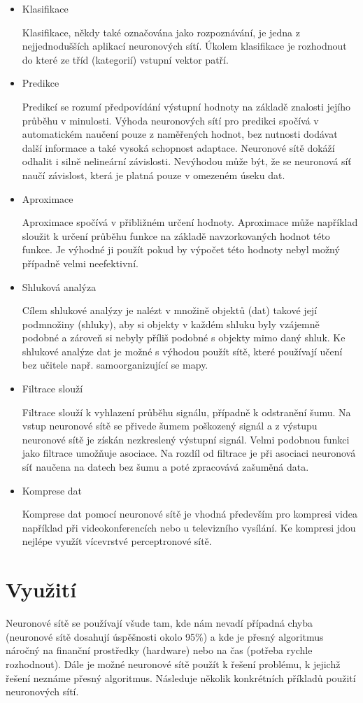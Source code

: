 \documentclass[11pt,twoside,a4paper]{book}
\begin{document}
\begin{itemize}
\item Klasifikace

Klasifikace, někdy také označována jako rozpoznávání, je jedna z nejjednodušších aplikací neuronových sítí. Úkolem klasifikace je rozhodnout do které ze tříd (kategorií) vstupní vektor patří.
\newpage
\item Predikce

Predikcí se rozumí předpovídání výstupní hodnoty na základě znalosti jejího průběhu v minulosti. Výhoda neuronových sítí pro predikci spočívá v automatickém naučení pouze z naměřených hodnot, bez nutnosti dodávat další informace a také vysoká schopnost adaptace. Neuronové sítě dokáží odhalit i silně nelineární závislosti. Nevýhodou může být, že se neuronová síť naučí závislost, která je platná pouze v omezeném úseku dat. 
\item Aproximace

Aproximace spočívá v přibližném určení hodnoty. Aproximace může například sloužit k určení průběhu funkce na základě navzorkovaných hodnot této funkce. Je výhodné ji použít pokud by výpočet této hodnoty nebyl možný případně velmi neefektivní.
\item Shluková analýza

Cílem shlukové analýzy je nalézt v množině objektů (dat) takové její podmnožiny (shluky), aby si objekty v každém shluku byly vzájemně podobné a zároveň si nebyly příliš podobné s objekty mimo daný shluk. Ke shlukové analýze dat je možné s výhodou použít sítě, které používají učení bez učitele např. samoorganizující se mapy.
\item Filtrace slouží

Filtrace slouží k vyhlazení průběhu signálu, případně k odstranění šumu. Na vstup neuronové sítě se přivede šumem poškozený signál a z výstupu neuronové sítě je získán nezkreslený výstupní signál. Velmi podobnou funkci jako filtrace umožňuje asociace. Na rozdíl od filtrace je při asociaci neuronová síť naučena na datech bez šumu a poté zpracovává zašuměná data.
\item Komprese dat

Komprese dat pomocí neuronové sítě je vhodná především pro kompresi videa například při videokonferencích nebo u televizního vysílání. Ke kompresi jdou nejlépe využít vícevrstvé perceptronové sítě.
\end{itemize}

\section{Využití}
Neuronové sítě se používají všude tam, kde nám nevadí případná chyba (neuronové sítě dosahují úspěšnosti okolo 95\%) a kde je přesný algoritmus náročný na finanční prostředky (hardware) nebo na čas (potřeba rychle rozhodnout). Dále je možné neuronové sítě použít k řešení problému, k jejichž řešení neznáme přesný algoritmus. Následuje několik konkrétních příkladů použití neuronových sítí.
\end{document}
